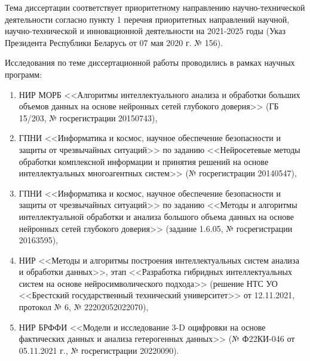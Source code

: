{\actuality}
\vspace{3mm}

Тема диссертации соответствует приоритетному направлению научно-технической деятельности согласно пункту 1 перечня приоритетных направлений научной, научно-технической и инновационной деятельности на 2021-2025 годы  (Указ Президента Республики Беларусь от 07 мая 2020 г. № 156).

Исследования по теме диссертационной работы проводились в рамках научных программ:
\begin{enumerate}[wide, labelindent=10mm]
\item НИР МОРБ <<Алгоритмы интеллектуального анализа и обработки больших объемов данных на основе нейронных сетей глубокого доверия>> (ГБ 15/203, № госрегистрации 20150743),
\item ГПНИ <<Информатика и космос, научное обеспечение безопасности и защиты от чрезвычайных ситуаций>> по заданию <<Нейросетевые методы обработки комплексной информации и принятия решений на основе интеллектуальных многоагентных систем>> (№ госрегистрации 20140547),
\item ГПНИ <<Информатика и космос, научное обеспечение безопасности и защиты от чрезвычайных ситуаций>> по заданию <<Методы и алгоритмы интеллектуальной обработки и анализа большого объема данных на основе нейронных сетей глубокого доверия>> (задание 1.6.05, № госрегистрации 20163595),
\item НИР <<Методы и алгоритмы построения интеллектуальных систем анализа и обработки данных>>, этап <<Разработка гибридных интеллектуальных систем на основе нейросимволического подхода>> (решение НТС УО <<Брестский государственный технический университет>> от 12.11.2021, протокол № 6, № 22202052022070),
\item НИР БРФФИ <<Модели и исследование 3-D оцифровки на основе фактических данных и анализа гетерогенных данных>> (№ Ф22КИ-046 от 05.11.2021 г., № госрегистрации 20220090).
\end{enumerate}



